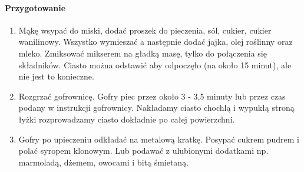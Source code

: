 \documentclass{article}
\begin{document}
    \paragraph{Przygotowanie}
    \begin{enumerate}
        \item Mąkę wsypać do miski, dodać proszek do pieczenia, sól, cukier,
            cukier wanilinowy. Wszystko wymieszać a następnie dodać jajka, olej
            roślinny oraz mleko. Zmiksować mikserem na gładką masę, tylko do
            połączenia się składników. Ciasto można odstawić aby odpoczęło (na
            około 15 minut), ale nie jest to konieczne.
        \item Rozgrzać gofrownicę. Gofry piec przez około 3 - 3,5 minuty lub
            przez czas podany w instrukcji gofrownicy. Nakładamy ciasto chochlą
            i wypukłą stroną łyżki rozprowadzamy ciasto dokładnie po całej
            powierzchni.
        \item Gofry po upieczeniu odkładać na metalową kratkę. Posypać cukrem
            pudrem i polać syropem klonowym. Lub podawać z ulubionymi dodatkami
            np. marmoladą, dżemem, owocami i bitą śmietaną.
    \end{enumerate}
    \newpage
\end{document}

